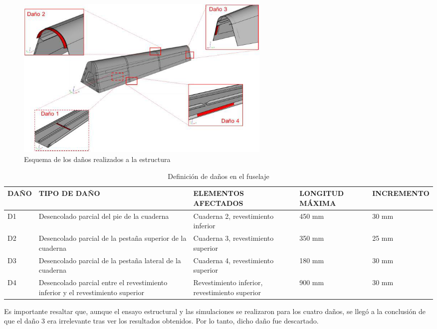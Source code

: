 \begin{figure}[ht]
    \centering
    \includegraphics[width=125mm]{3/Fotos/dam.png}
    \caption{Esquema de los daños realizados a la estructura}
    \label{dam}
\end{figure}

\begin{table}[h!]
    \centering
    \begin{tabular}{ | m{12.5mm} | m{37.5mm}| m{30mm} |  m{25mm} |  m{25mm} |}  \hline
        \textbf{\footnotesize{DAÑO}}& \textbf{\footnotesize{TIPO DE DAÑO}} & \textbf{\footnotesize{ELEMENTOS AFECTADOS}} & \textbf{\footnotesize{LONGITUD MÁXIMA}} & \textbf{\footnotesize{INCREMENTO}}\\ 
        \hline
        D1 & Desencolado parcial del pie de la cuaderna & Cuaderna 2, revestimiento inferior & 450 mm & 30 mm \\ 
        \hline
        D2 & Desencolado parcial de la pestaña superior de la cuaderna & Cuaderna 3, revestimiento superior & 350 mm & 25 mm \\ 
        \hline
        D3 & Desencolado parcial de la pestaña lateral de la cuaderna & Cuaderna 4, revestimiento superior & 180 mm & 30 mm \\ 
        \hline
        D4 & Desencolado parcial entre el revestimiento inferior y el revestimiento superior & Revestimiento inferior, revestimiento superior & 900 mm & 30 mm \\ 
        \hline
    \end{tabular}
    \caption{Definición de daños en el fuselaje}
    \label{tdam}
\end{table}

Es importante resaltar que, aunque el ensayo estructural y las simulaciones se realizaron para los cuatro daños, se llegó a la conclusión de que el daño 3 era irrelevante tras ver los resultados obtenidos. Por lo tanto, dicho daño fue descartado.\\

